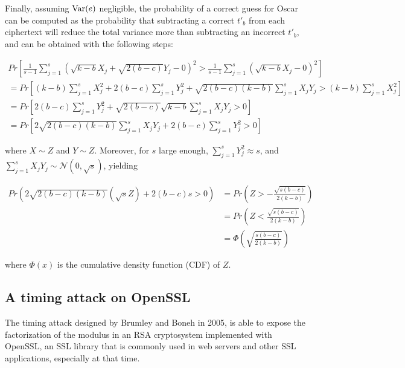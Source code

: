 Finally, assuming $\operatorname{Var}(e)$ negligible, the probability of a correct guess for Oscar can be computed as the probability that subtracting a correct $t'_b$ from each ciphertext will reduce the total variance more than subtracting an incorrect $t'_b$, and can be obtained with the following steps:

\begin{gather*}
Pr \left[
  \frac{1}{s - 1}
  \sum\limits_{j = 1}^{s} \left(
    \sqrt{k - b} X_j  + \sqrt{2(b - c)} Y_j - 0
  \right)^2
  > \frac{1}{s - 1}\sum\limits_{j = 1}^{s} \left(
    \sqrt{k - b} X_j - 0
  \right)^2
\right] \\
= Pr \left[
  (k - b) \sum\limits_{j = 1}^{s} X_j^2
  + 2(b - c) \sum\limits_{j = 1}^{s} Y_j^2
  + \sqrt{2(b - c)(k - b)} \sum\limits_{j = 1}^{s} X_j Y_j
  > (k - b) \sum\limits_{j = 1}^{s} X_j^2
\right] \\
= Pr \left[
  2(b - c) \sum\limits_{j = 1}^{s} Y_j^2
  + \sqrt{2(b - c)}\sqrt{k - b} \sum\limits_{j = 1}^{s} X_j Y_j
  > 0
\right] \\
= Pr \left[
  2 \sqrt{ 2(b - c)(k - b) } \sum\limits_{j = 1}^{s} X_j Y_j
  + 2(b - c) \sum\limits_{j = 1}^{s} Y_j^2 > 0
\right]
\end{gather*}

where $X \sim Z$ and $Y \sim Z$. Moreover, for $s$ large enough, $\sum_{j = 1}^{s}Y_j^2 \approx s$, and $\sum_{j = 1}^{s}X_jY_j \sim \mathcal{N}(0, \sqrt{s})$, yielding

\begin{align*}
Pr \left(
  2\sqrt{2(b - c)(k - b)} \left( \sqrt{s} Z \right)
    + 2(b - c)s > 0
\right) &= Pr \left(
  Z > - \frac{ \sqrt{s(b - c)} }{2(k - b)}
\right) \\
&= Pr \left(
  Z < \frac{\sqrt{s(b - c)}}{2(k - b)}
\right) \\
&= \Phi \left( \sqrt{ \frac{s(b - c)}{2(k - b)} } \right)
\end{align*}

where $\Phi(x)$ is the cumulative density function (CDF) of $Z$.

\subsection{A timing attack on OpenSSL}\label{subsec:openssl}

The timing attack designed by Brumley and Boneh in 2005, is able to expose the factorization of the modulus in an RSA cryptosystem implemented with OpenSSL, an SSL library that is commonly used in web servers and other SSL applications, especially at that time.

